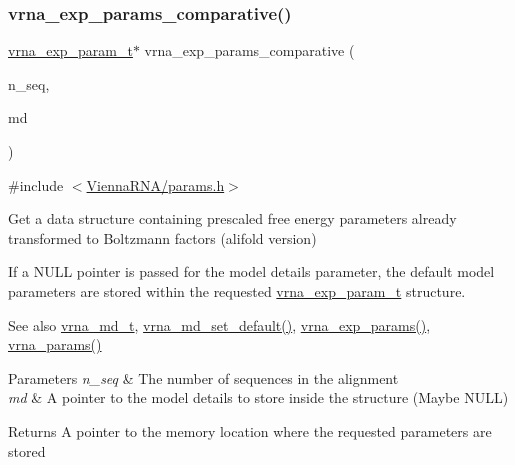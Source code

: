 \subsubsection{\texorpdfstring{vrna\+\_\+exp\+\_\+params\+\_\+comparative()}{vrna\_exp\_params\_comparative()}}
{\footnotesize\ttfamily \mbox{\hyperlink{group__energy__parameters_ga01d8b92fe734df8d79a6169482c7d8d8}{vrna\+\_\+exp\+\_\+param\+\_\+t}}$\ast$ vrna\+\_\+exp\+\_\+params\+\_\+comparative (\begin{DoxyParamCaption}\item[{unsigned int}]{n\+\_\+seq,  }\item[{\mbox{\hyperlink{group__model__details_ga1f8a10e12a0a1915f2a4eff0b28ea17c}{vrna\+\_\+md\+\_\+t}} $\ast$}]{md }\end{DoxyParamCaption})}



{\ttfamily \#include $<$\mbox{\hyperlink{params_8h}{Vienna\+R\+N\+A/params.\+h}}$>$}



Get a data structure containing prescaled free energy parameters already transformed to Boltzmann factors (alifold version) 

If a N\+U\+LL pointer is passed for the model details parameter, the default model parameters are stored within the requested \mbox{\hyperlink{group__energy__parameters_ga01d8b92fe734df8d79a6169482c7d8d8}{vrna\+\_\+exp\+\_\+param\+\_\+t}} structure.

\begin{DoxySeeAlso}{See also}
\mbox{\hyperlink{group__model__details_ga1f8a10e12a0a1915f2a4eff0b28ea17c}{vrna\+\_\+md\+\_\+t}}, \mbox{\hyperlink{group__model__details_ga8ac6ff84936282436f822644bf841f66}{vrna\+\_\+md\+\_\+set\+\_\+default()}}, \mbox{\hyperlink{group__energy__parameters_gab1f3016f96aa96bff020cdd904605afa}{vrna\+\_\+exp\+\_\+params()}}, \mbox{\hyperlink{group__energy__parameters_gad0e3e7e74bdc50d1709d40c92993185e}{vrna\+\_\+params()}}
\end{DoxySeeAlso}

\begin{DoxyParams}{Parameters}
{\em n\+\_\+seq} & The number of sequences in the alignment \\
\hline
{\em md} & A pointer to the model details to store inside the structure (Maybe N\+U\+LL) \\
\hline
\end{DoxyParams}
\begin{DoxyReturn}{Returns}
A pointer to the memory location where the requested parameters are stored 
\end{DoxyReturn}
\mbox{\label{group__energy__parameters_ga70bc46be7cfa5434a71efe241c4f0609}} 
